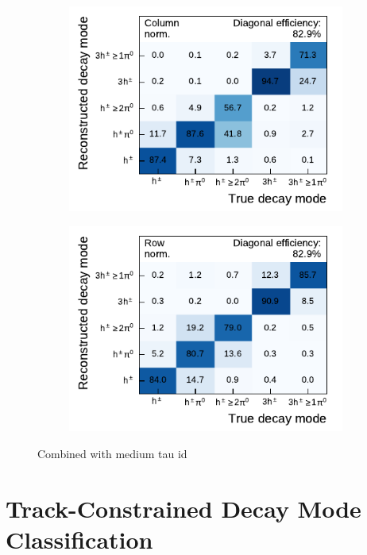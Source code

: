 \begin{figure}[htbp]
  \begin{subfigure}{0.48\textwidth}
    \centering
    \includegraphics{./figures/decay_mode_classification/combined_sub_e_moments_shots_conv_ptcut_1_5/mig_mat_med_id.pdf}
  \end{subfigure}\hfill
  \begin{subfigure}{0.48\textwidth}
    \centering
    \includegraphics{./figures/decay_mode_classification/combined_sub_e_moments_shots_conv_ptcut_1_5/comp_mat_med_id.pdf}
  \end{subfigure}
  \caption{Combined with medium tau id}
  \label{fig:decay_mode_combined_med_id}
\end{figure}

\clearpage
\section{Track-Constrained Decay Mode Classification}
\label{app:mode_classification_track_constraint}

